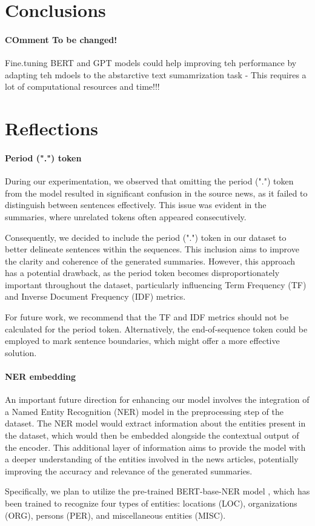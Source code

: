 \section{Conclusions}
\paragraph{COmment To be changed!}Fine.tuning BERT and GPT models could help improving teh performance by adapting teh mdoels to the abstarctive text sumamrization task - This requires a lot of computational resources and time!!!

\section{Reflections}
\paragraph{Period (".") token}
During our experimentation, we observed that omitting the period (".") token from the model resulted in significant confusion in the source news, as it failed to distinguish between sentences effectively. This issue was evident in the summaries, where unrelated tokens often appeared consecutively.

Consequently, we decided to include the period (".") token in our dataset to better delineate sentences within the sequences. This inclusion aims to improve the clarity and coherence of the generated summaries. However, this approach has a potential drawback, as the period token becomes disproportionately important throughout the dataset, particularly influencing Term Frequency (TF) and Inverse Document Frequency (IDF) metrics.

For future work, we recommend that the TF and IDF metrics should not be calculated for the period token. Alternatively, the end-of-sequence token could be employed to mark sentence boundaries, which might offer a more effective solution.

\paragraph{NER embedding}
An important future direction for enhancing our model involves the integration of a Named Entity Recognition (NER) model in the preprocessing step of the dataset. The NER model would extract information about the entities present in the dataset, which would then be embedded alongside the contextual output of the encoder. This additional layer of information aims to provide the model with a deeper understanding of the entities involved in the news articles, potentially improving the accuracy and relevance of the generated summaries. 

Specifically, we plan to utilize the pre-trained BERT-base-NER model \citep{BERT-NER}, which has been trained to recognize four types of entities: locations (LOC), organizations (ORG), persons (PER), and miscellaneous entities (MISC). 


